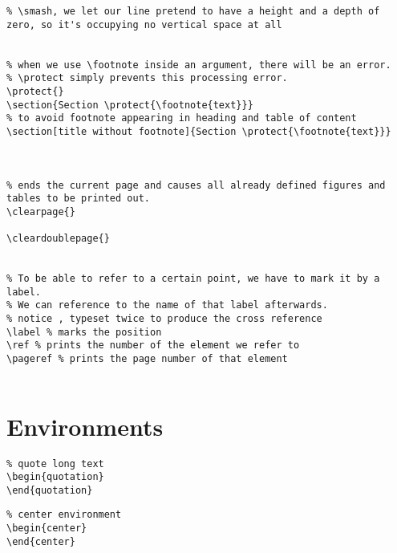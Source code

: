 \begin{lstlisting}
% \smash, we let our line pretend to have a height and a depth of 
zero, so it's occupying no vertical space at all


% when we use \footnote inside an argument, there will be an error. 
% \protect simply prevents this processing error. 
\protect{}
\section{Section \protect{\footnote{text}}}
% to avoid footnote appearing in heading and table of content
\section[title without footnote]{Section \protect{\footnote{text}}}



% ends the current page and causes all already defined figures and
tables to be printed out.
\clearpage{}

\cleardoublepage{}


% To be able to refer to a certain point, we have to mark it by a label.
% We can reference to the name of that label afterwards.
% notice , typeset twice to produce the cross reference
\label % marks the position
\ref % prints the number of the element we refer to 
\pageref % prints the page number of that element


\end{lstlisting}


\section{Environments}
\label{sec:environments}


\begin{lstlisting}
% quote long text
\begin{quotation}
\end{quotation}
\end{lstlisting}

\begin{lstlisting}
% center environment
\begin{center}
\end{center}
\end{lstlisting}


